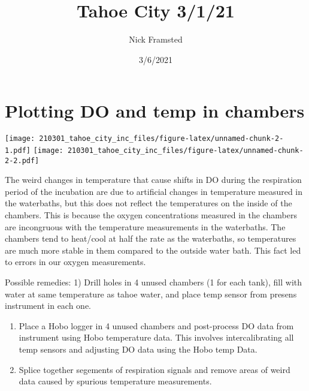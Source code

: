 \documentclass[
]{article}
\title{Tahoe City 3/1/21}
\author{Nick Framsted}
\date{3/6/2021}
\begin{document}
\maketitle

\hypertarget{plotting-do-and-temp-in-chambers}{%
\section{Plotting DO and temp in
chambers}\label{plotting-do-and-temp-in-chambers}}

\texttt{[image: 210301\_tahoe\_city\_inc\_files/figure-latex/unnamed-chunk-2-1.pdf]}
\texttt{[image: 210301\_tahoe\_city\_inc\_files/figure-latex/unnamed-chunk-2-2.pdf]}

The weird changes in temperature that cause shifts in DO during the
respiration period of the incubation are due to artificial changes in
temperature measured in the waterbaths, but this does not reflect the
temperatures on the inside of the chambers. This is because the oxygen
concentrations measured in the chambers are incongruous with the
temperature measurements in the waterbaths. The chambers tend to
heat/cool at half the rate as the waterbaths, so temperatures are much
more stable in them compared to the outside water bath. This fact led to
errors in our oxygen measurements.

Possible remedies: 1) Drill holes in 4 unused chambers (1 for each
tank), fill with water at same temperature as tahoe water, and place
temp sensor from presens instrument in each one.

\begin{enumerate}
\def\labelenumi{\arabic{enumi})}
\setcounter{enumi}{1}
\item
  Place a Hobo logger in 4 unused chambers and post-process DO data from
  instrument using Hobo temperature data. This involves intercalibrating
  all temp sensors and adjusting DO data using the Hobo temp Data.
\item
  Splice together segements of respiration signals and remove areas of
  weird data caused by spurious temperature measurements.
\end{enumerate}
\end{document}
